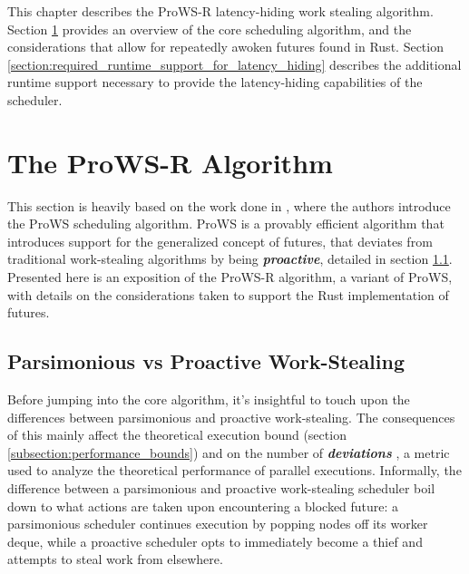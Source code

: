 \documentclass[bsc,frontabs,singlespacing,parskip,deptreport,normalheadings]{infthesis}
\begin{document}
This chapter describes the ProWS-R latency-hiding work stealing algorithm.
Section \ref{section:overview_of_the_prows_algorithm} provides an overview of
the core scheduling algorithm, and the considerations that allow for repeatedly
awoken futures found in Rust. Section
\ref{section:required_runtime_support_for_latency_hiding} describes the
additional runtime support necessary to provide the latency-hiding capabilities
of the scheduler.

\section{The ProWS-R Algorithm}
\label{section:overview_of_the_prows_algorithm}

This section is heavily based on the work done in \cite{singer_proactive_2019},
where the authors introduce the ProWS scheduling algorithm. ProWS is a provably
efficient algorithm that introduces support for the generalized concept of
futures, that deviates from traditional work-stealing algorithms by being
\textit{\textbf{proactive}}, detailed in section 
\ref{subsection:parsimonious_vs_proactive_work-stealing}. Presented here is an
exposition of the ProWS-R algorithm, a variant of ProWS, with details on the
considerations taken to support the Rust implementation of futures.

\subsection{Parsimonious vs Proactive Work-Stealing}
\label{subsection:parsimonious_vs_proactive_work-stealing}

Before jumping into the core algorithm, it's insightful to touch upon the
differences between parsimonious and proactive work-stealing. The consequences
of this mainly affect the theoretical execution bound (section
\ref{subsection:performance_bounds}) and on the number of
\textit{\textbf{deviations}} \cite{spoonhower_beyond_2009}, a metric used to
analyze the theoretical performance of parallel executions. Informally, the
difference between a parsimonious and proactive work-stealing scheduler boil
down to what actions are taken upon encountering a blocked future: a
parsimonious scheduler continues execution by popping nodes off its worker
deque, while a proactive scheduler opts to immediately become a thief and
attempts to steal work from elsewhere. 
\end{document}
